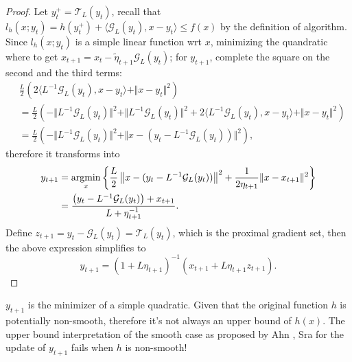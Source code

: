 \documentclass[12pt]{article}
\begin{document}
    \begin{proof}
        Let $y_t^+ = \mathcal T_L(y_t)$, recall that $l_h(x; y_t) = h(y_t^+) + \langle \mathcal G_L(y_t), x -y_t\rangle \le f(x)$ by the definition of algorithm. 
        Since $l_h(x; y_t)$ is a simple linear function wrt $x$, minimizing the quandratic where to get $x_{t + 1} = x_t - \tilde\eta_{t + 1} \mathcal G_L(y_t)$; for $y_{t + 1}$, complete the square on the second and the third terms: 
        \begin{align*}
            & \frac{L}{2}\left(
                2\langle L^{-1}\mathcal G_L(y_t), x - y_t\rangle + 
                \Vert x - y_t\Vert^2
            \right)
            \\
            &= 
            \frac{L}{2}
            \left(
                - \Vert L^{-1} \mathcal G_L(y_t)\Vert^2  
                + \Vert L^{-1} \mathcal G_L(y_t)\Vert^2 
                + 
                2\langle L^{-1} \mathcal G_L(y_t), x - y_t\rangle + 
                \Vert x - y_t\Vert^2
            \right)
            \\
            &= \frac{L}{2}\left(
                - \Vert L^{-1}\mathcal G_L(y_t)\Vert^2  
                + \Vert x - (y_t - L^{-1}\mathcal G_L(y_t))
                \Vert^2
            \right), 
        \end{align*}
        therefore it transforms into 
        \begin{align*}
            y_{t + 1} &=\mathop{\rm argmin}\limits_{x} \left\lbrace
                \frac{L}{2}\left\Vert 
                    x - (y_t - L^{-1}\mathcal G_L(y_t))
                \right\Vert^2
                + \frac{1}{2\eta_{t + 1}}\Vert x - x_{t + 1}\Vert^2
            \right\rbrace
            \\
            &=
            \frac{
                \left(y_t - L^{-1}\mathcal G_L(y_t)\right) + x_{t + 1}
            }{L + \eta_{t + 1}^{-1}}.
        \end{align*}
        Define $z_{t + 1} = y_t - \mathcal G_L(y_t) = \mathcal T_L(y_t)$, which is the proximal gradient set, then the above expression simplifies to 
        $$
        y_{t + 1} = (1 + L\eta_{t +1})^{-1}(x_{t + 1}+ L\eta_{t + 1}z_{t + 1}). 
        $$
    \end{proof}
    \begin{remark}
        $y_{t + 1}$ is the minimizer of a simple quadratic. 
        Given that the original function $h$ is potentially non-smooth, therefore it's not always an upper bound of $h(x)$. 
        The upper bound interpretation of the smooth case as proposed by Ahn \cite{ahn_understanding_2022}, Sra for the update of $y_{t + 1}$ fails when $h$ is non-smooth! 
    \end{remark}
\end{document}
